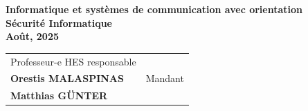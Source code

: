 \begin{titlepage}
\begin{center}
{{				%
				{\large 
				 \fontsize{14pt}{20pt} \textbf{Informatique et systèmes de communication avec orientation\\ Sécurité Informatique }\\[32pt]
				
				\textbf{Août, 2025}}\\[49pt]
				
				{
					\begin{tabular*}{16cm}{>{\centering}m{7.59cm}>{\centering}m{7.58cm}}
						Professeur-e HES responsable\\[13pt]
						\textbf{  Orestis MALASPINAS }
						&
						Mandant\\[12pt]
						\textbf{ Matthias GÜNTER}
					\end{tabular*}
				}
			}
			\vfill
		}%
	\end{center}
\end{titlepage}
\addtocounter{page}{1}
